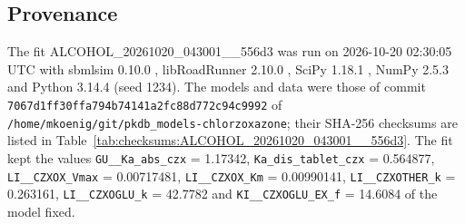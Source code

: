 \documentclass{article}
\begin{document}
\subsection{Provenance}

The fit ALCOHOL\_20261020\_043001\_\_556d3 was run on 2026-10-20 02:30:05 UTC with sbmlsim 0.10.0 \cite{Koenig2026_sbmlsim}, libRoadRunner 2.10.0 \cite{Welsh2023}, SciPy 1.18.1 \cite{Virtanen2020}, NumPy 2.5.3 \cite{Harris2020} and Python 3.14.4 (seed 1234). The models and data were those of commit \texttt{7067d1ff30ffa794b74141a2fc88d772c94c9992} of \texttt{/home/mkoenig/git/pkdb\_models-chlorzoxazone}; their SHA-256 checksums are listed in Table~\ref{tab:checksums:ALCOHOL_20261020_043001__556d3}. The fit kept the values \texttt{GU\_\_Ka\_abs\_czx} = 1.17342, \texttt{Ka\_dis\_tablet\_czx} = 0.564877, \texttt{LI\_\_CZXOX\_Vmax} = 0.00717481, \texttt{LI\_\_CZXOX\_Km} = 0.00990141, \texttt{LI\_\_CZXOTHER\_k} = 0.263161, \texttt{LI\_\_CZXOGLU\_k} = 42.7782 and \texttt{KI\_\_CZXOGLU\_EX\_f} = 14.6084 of the model fixed.
\end{document}
